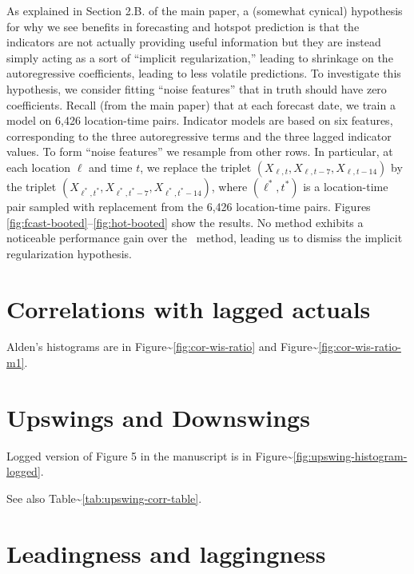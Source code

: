 \documentclass[9pt,twoside,lineno]{pnas-new}
\begin{document}
As explained in Section 2.B. of the main paper, a (somewhat cynical)
hypothesis for why we see benefits in forecasting and hotspot
prediction is that the indicators are not actually providing useful
information but they are instead simply acting as a sort of ``implicit
regularization,''  leading to shrinkage on the autoregressive
coefficients, leading to less volatile predictions.  To investigate
this hypothesis, we consider fitting  ``noise features'' that in truth
should have zero coefficients.  Recall (from the main paper) that at each forecast date, we
train a model on 6,426 location-time pairs.  Indicator models are
based on six features, corresponding to the three autoregressive terms
and the three lagged indicator values.  To form ``noise features''
we resample from other rows.  In particular, at each location $\ell$ and
time $t$, we replace the triplet $(X_{\ell,t}, X_{\ell,t-7},
X_{\ell,t-14})$ by the triplet $(X_{\ell^*,t^*}, X_{\ell^*,t^*-7},
X_{\ell^*,t^*-14})$, where $(\ell^*,t^*)$ is a location-time pair
sampled with replacement from the 6,426 location-time pairs.  Figures
\ref{fig:fcast-booted}--\ref{fig:hot-booted} show the results.  No
method exhibits a noticeable performance gain over the \ar~method,
leading us to dismiss the implicit regularization hypothesis.


\hypertarget{correlations-with-lagged-actuals}{%
\section{Correlations with lagged
actuals}\label{correlations-with-lagged-actuals}}

Alden's histograms are in Figure\textasciitilde{}\ref{fig:cor-wis-ratio}
and Figure\textasciitilde{}\ref{fig:cor-wis-ratio-m1}.

\hypertarget{upswings-and-downswings}{%
\section{Upswings and Downswings}\label{upswings-and-downswings}}

Logged version of Figure 5 in the manuscript is in
Figure\textasciitilde{}\ref{fig:upswing-histogram-logged}.

See also Table\textasciitilde{}\ref{tab:upswing-corr-table}.

\hypertarget{leadingness-and-laggingness}{%
\section{Leadingness and
laggingness}\label{leadingness-and-laggingness}}
\end{document}
